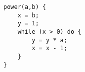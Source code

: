 \begin{lstlisting}
power(a,b) {
    x = b;
    y = 1;
    while (x > 0) do {
        y = y * a;
        x = x - 1;
    }
}
\end{lstlisting}
